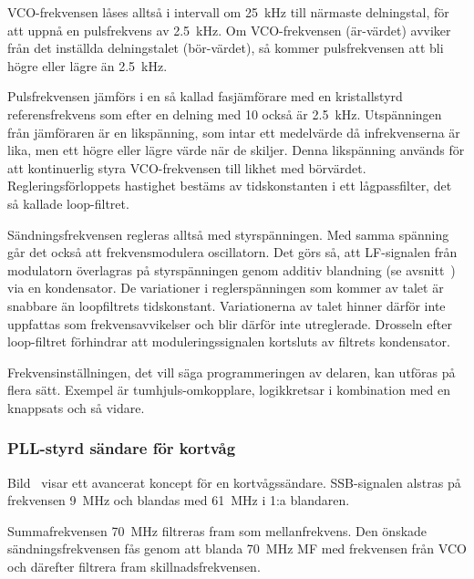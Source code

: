 VCO-frekvensen låses alltså i intervall om \qty{25}{\kilo\hertz} till närmaste
delningstal, för att uppnå en pulsfrekvens av \qty{2,5}{\kilo\hertz}.
Om VCO-frekvensen (är-värdet) avviker från det inställda delningstalet
(bör-värdet), så kommer pulsfrekvensen att bli högre eller lägre än
\qty{2,5}{\kilo\hertz}.

Pulsfrekvensen jämförs i en så kallad fasjämförare med en kristallstyrd
referensfrekvens som efter en delning med 10 också är \qty{2,5}{\kilo\hertz}.
Utspänningen från jämföraren är en likspänning, som intar ett
medelvärde då infrekvenserna är lika, men ett högre eller lägre värde
när de skiljer.
Denna likspänning används för att kontinuerlig styra VCO-frekvensen
till likhet med börvärdet.
Regleringsförloppets hastighet bestäms av tidskonstanten i ett
lågpassfilter, det så kallade loop-filtret.

Sändningsfrekvensen regleras alltså med styrspänningen.
Med samma spänning går det också att frekvensmodulera oscillatorn.
Det görs så, att LF-signalen från modulatorn överlagras på styrspänningen genom
additiv blandning (se avsnitt~) via en kondensator.
De variationer i reglerspänningen som kommer av talet är snabbare än
loopfiltrets tidskonstant.
Variationerna av talet hinner därför inte uppfattas som frekvensavvikelser och
blir därför inte utreglerade.
Drosseln efter loop-filtret förhindrar att moduleringssignalen kortsluts av
filtrets kondensator.

Frekvensinställningen, det vill säga programmeringen av delaren, kan utföras på
flera sätt.
Exempel är tumhjuls-omkopplare, logikkretsar i kombination med en knappsats och
så vidare.

\subsubsection{PLL-styrd sändare för kortvåg}


Bild~ visar ett avancerat koncept för en kortvågssändare.
SSB-signalen alstras på frekvensen \qty{9}{\mega\hertz} och blandas med
\qty{61}{\mega\hertz} i 1:a blandaren.

Summafrekvensen \qty{70}{\mega\hertz} filtreras fram som mellanfrekvens.
Den önskade sändningsfrekvensen fås genom att blanda \qty{70}{\mega\hertz} MF
med frekvensen från VCO och därefter filtrera fram skillnadsfrekvensen.


